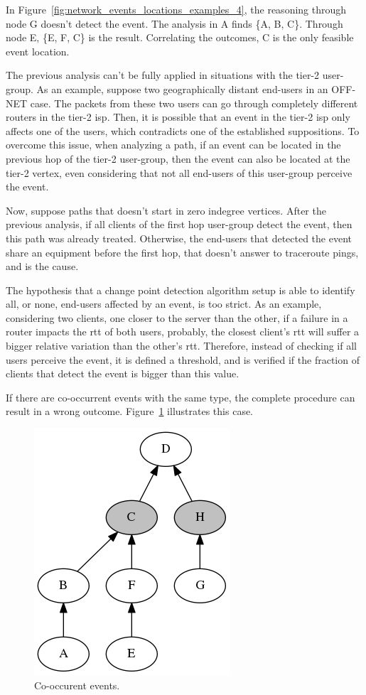 In Figure~\ref{fig:network_events_locations_examples_4}, the reasoning through
node G doesn't detect the event. The analysis in A finds \{A, B, C\}. Through
node E, \{E, F, C\} is the result.
Correlating the outcomes, C is the only feasible event location.

The previous analysis can't be fully applied in situations with the tier-2
user-group.
As an example, suppose two geographically distant end-users in an OFF-NET case.
The packets from these two users can go through completely different routers in
the tier-2 \gls*{isp}. Then, it is possible that an event in the tier-2 \gls*{isp} only
affects one of the users, which contradicts one of the established suppositions.
To overcome this issue, when analyzing a path, if an event can be located in the
previous hop of the tier-2 user-group, then the event can also be located at
the tier-2 vertex, even considering that not all end-users of this user-group
perceive the event.

Now, suppose paths that doesn't start in zero indegree vertices.
After the previous analysis,
if all clients of the first hop user-group detect the event, then this
path was already treated. Otherwise, the end-users that detected the event
share an equipment before the first hop,
that doesn't answer to traceroute pings, and is the cause.

The hypothesis that a change point detection algorithm setup is able to
identify all, or none, end-users affected by an event, is too strict.
As an example, considering two clients, one closer to the server than the
other, if a failure in a router impacts the \gls*{rtt} of both users, probably,
the closest client's \gls*{rtt} will suffer a bigger relative variation than the
other's \gls*{rtt}\@.
Therefore, instead of checking if all users perceive the event,
it is defined a threshold, and is verified if the fraction of clients
that detect the event is bigger than this value.

If there are co-occurrent events with the same type, the complete procedure can
result in a wrong outcome. Figure~\ref{fig:network_events_locations_examples_5}
illustrates this case.

\begin{figure}[H]
    \centering
    \includegraphics[width=0.35\linewidth]{./figures/methodology/spatial_time_correlation/event_tree_graph_5.png}
    \caption{Co-occurent events.}
\label{fig:network_events_locations_examples_5}
\end{figure}%

